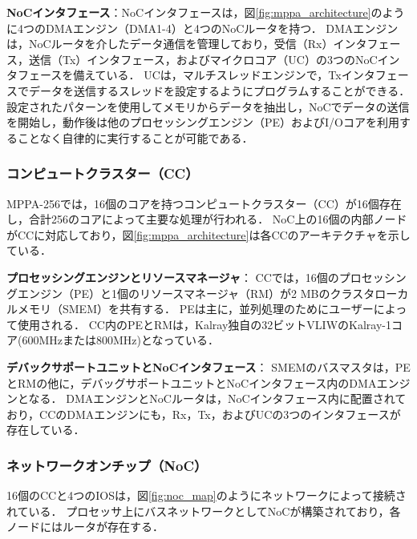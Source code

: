 \documentclass[submit,techrep]{ipsj_v2/UTF8/ipsj}
\begin{document}
\textbf{NoCインタフェース}：NoCインタフェースは，図\ref{fig:mppa_architecture}のように4つのDMAエンジン（DMA1-4）と4つのNoCルータを持つ．
DMAエンジンは，NoCルータを介したデータ通信を管理しており，受信（Rx）インタフェース，送信（Tx）インタフェース，およびマイクロコア（UC）の3つのNoCインタフェースを備えている．
UCは，マルチスレッドエンジンで，Txインタフェースでデータを送信するスレッドを設定するようにプログラムすることができる．
設定されたパターンを使用してメモリからデータを抽出し，NoCでデータの送信を開始し，動作後は他のプロセッシングエンジン（PE）およびI/Oコアを利用することなく自律的に実行することが可能である．

\subsubsection{コンピュートクラスター（CC）}
\label{sec:cc}
MPPA-256では，16個のコアを持つコンピュートクラスター（CC）が16個存在し，合計256のコアによって主要な処理が行われる．
NoC上の16個の内部ノードがCCに対応しており，図\ref{fig:mppa_architecture}は各CCのアーキテクチャを示している．

\textbf{プロセッシングエンジンとリソースマネージャ}：
CCでは，16個のプロセッシングエンジン（PE）と1個のリソースマネージャ（RM）が2 MBのクラスタローカルメモリ（SMEM）を共有する．
PEは主に，並列処理のためにユーザーによって使用される．
CC内のPEとRMは，Kalray独自の32ビットVLIWのKalray-1コア(600MHzまたは800MHz)となっている．

\textbf{デバックサポートユニットとNoCインタフェース}：
SMEMのバスマスタは，PEとRMの他に，デバッグサポートユニットとNoCインタフェース内のDMAエンジンとなる．
DMAエンジンとNoCルータは，NoCインタフェース内に配置されており，CCのDMAエンジンにも，Rx，Tx，およびUCの3つのインタフェースが存在している．

\subsubsection{ネットワークオンチップ（NoC）}
\label{sec:noc}
16個のCCと4つのIOSは，図\ref{fig:noc_map}のようにネットワークによって接続されている．
プロセッサ上にバスネットワークとしてNoCが構築されており，各ノードにはルータが存在する．
\end{document}
